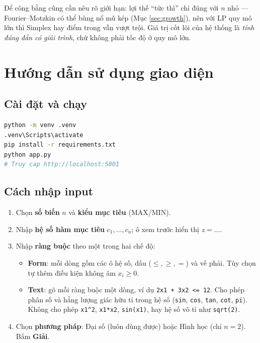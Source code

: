 \documentclass[12pt,a4paper]{article}
\theoremstyle{definition}
\begin{document}
Để công bằng cũng cần nêu rõ giới hạn: lợi thế ``tức thì'' chỉ đúng với $n$ nhỏ
--- Fourier--Motzkin có thể bùng nổ mũ kép (Mục \ref{sec:growth}), nên với LP
quy mô lớn thì Simplex hay điểm trong vẫn vượt trội. Giá trị cốt lõi của hệ
thống là \emph{tính đúng đắn có giải trình}, chứ không phải tốc độ ở quy mô lớn.

\section{Hướng dẫn sử dụng giao diện}

\subsection{Cài đặt và chạy}

\begin{lstlisting}[language=bash, caption={Chạy ứng dụng ở local (Windows)}]
python -m venv .venv
.venv\Scripts\activate
pip install -r requirements.txt
python app.py
# Truy cap http://localhost:5001
\end{lstlisting}

\subsection{Cách nhập input}

\begin{enumerate}
    \item Chọn \textbf{số biến} $n$ và \textbf{kiểu mục tiêu} (MAX/MIN).
    \item Nhập \textbf{hệ số hàm mục tiêu} $c_1, \ldots, c_n$; ô xem trước hiển
          thị $z = \ldots$.
    \item Nhập \textbf{ràng buộc} theo một trong hai chế độ:
    \begin{itemize}
        \item \textbf{Form}: mỗi dòng gồm các ô hệ số, dấu ($\le, \ge, =$) và vế
              phải. Tùy chọn tự thêm điều kiện không âm $x_i \ge 0$.
        \item \textbf{Text}: gõ mỗi ràng buộc một dòng, ví dụ
              \texttt{2x1 + 3x2 <= 12}. Cho phép phân số và hằng lượng giác hữu
              tỉ trong hệ số (\texttt{sin}, \texttt{cos}, \texttt{tan},
              \texttt{cot}, \texttt{pi}). Không cho phép \texttt{x1\^{}2},
              \texttt{x1*x2}, \texttt{sin(x1)}, hay hệ số vô tỉ như
              \texttt{sqrt(2)}.
    \end{itemize}
    \item Chọn \textbf{phương pháp}: Đại số (luôn dùng được) hoặc Hình học (chỉ
          $n = 2$). Bấm \textbf{Giải}.
\end{enumerate}
\end{document}

